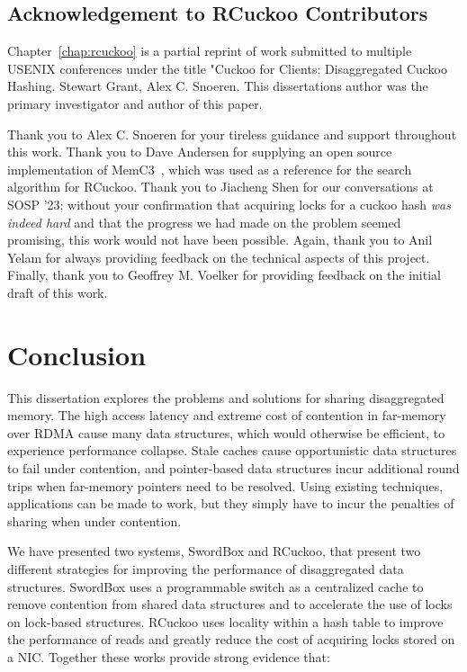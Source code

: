 \documentclass[12pt]{ucsddissertation}
\newcommand{\sword}{SwordBox}
\begin{document}
\section{Acknowledgement to RCuckoo Contributors}

Chapter~\ref{chap:rcuckoo} is a partial reprint of work submitted to multiple USENIX conferences
under the title "Cuckoo for Clients: Disaggregated Cuckoo Hashing. Stewart Grant, Alex C. Snoeren.
This dissertations author was the primary investigator and author of this paper.

Thank you to Alex C. Snoeren for your tireless guidance and support throughout this work. Thank you
to Dave Andersen for supplying an open source implementation of MemC3~\cite{memc3}, which was used
as a reference for the search algorithm for RCuckoo. Thank you to Jiacheng Shen for our
conversations at SOSP '23; without your confirmation that acquiring locks for a cuckoo hash
\textit{was indeed hard} and that the progress we had made on the problem seemed promising, this
work would not have been possible. Again, thank you to Anil Yelam for always providing feedback on
the technical aspects of this project. Finally, thank you to Geoffrey M. Voelker for providing
feedback on the initial draft of this work.


\chapter{Conclusion}

This dissertation explores the problems and solutions for sharing disaggregated memory. The high
access latency and extreme cost of contention in far-memory over RDMA cause many data structures,
which would otherwise be efficient, to experience performance collapse. Stale caches cause
opportunistic data structures to fail under contention, and pointer-based data structures incur
additional round trips when far-memory pointers need to be resolved. Using existing techniques,
applications can be made to work, but they simply have to incur the penalties of sharing when under
contention.

We have presented two systems, {\sword} and RCuckoo, that present two different strategies for
improving the performance of disaggregated data structures. {\sword} uses a programmable
switch as a centralized cache to remove contention from shared data structures and to accelerate the
use of locks on lock-based structures. RCuckoo uses locality within a hash table to improve the
performance of reads and greatly reduce the cost of acquiring locks stored on a NIC. Together these
works provide strong evidence that:
\end{document}
